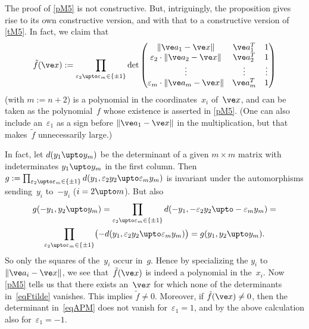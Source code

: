 \documentclass[reqno]{amsart}
\begin{document}
\begin{rem} \label{rM5}%
  The proof of \cref{pM5} is not constructive. But, intriguingly, the
  proposition gives rise to its own constructive version, and with
  that to a constructive version of \cref{tM5}. In fact, we claim that
  \begin{equation} \label{eqFtilde}%
    \tilde f(\ve x) := \prod_{\varepsilon_2 \upto \varepsilon_m \in \{\pm
      1\}} \det\begin{pmatrix}
      \lVert\ve a_1 - \ve x\rVert & \ve a_1^T & 1
      \\
      \varepsilon_2 \cdot \lVert\ve a_2 - \ve x\rVert & \ve a_2^T & 1 \\
      \vdots & \vdots & \vdots \\
      \varepsilon_m \cdot \lVert\ve a_m - \ve x\rVert & \ve
      a_m^T & 1
    \end{pmatrix}
  \end{equation}
  (with $m := n+2$) is a polynomial in the coordinates~$x_i$
  of~$\ve x$, and can be taken as the polynomial~$f$ whose existence
  is asserted in \cref{pM5}. (One can also include an~$\varepsilon_1$
  as a sign before $\lVert\ve a_1 - \ve x\rVert$ in the
  multiplication, but that makes~$\tilde f$ unnecessarily large.)

  In fact, let $d(y_1 \upto y_m)$ be the
  determinant of a given $m \times m$ matrix with indeterminates
  $y_1 \upto y_m$ in the first column. Then
  $g := \prod_{\varepsilon_2 \upto \varepsilon_m \in \{\pm 1\}}
  d(y_1,\varepsilon_2 y_2 \upto \varepsilon_m y_m)$ is invariant under
  the automorphisms sending~$y_i$ to~$-y_i$ ($i = 2 \upto m$). But
  also
  \begin{multline*}
    g(-y_1,y_2 \upto y_m) = \prod_{\varepsilon_2 \upto \varepsilon_m
      \in \{\pm 1\}} d(-y_1,-\varepsilon_2 y_2 \upto -\varepsilon_m
    y_m) = \\
    \prod_{\varepsilon_2 \upto \varepsilon_m \in \{\pm 1\}}
    \bigl(-d(y_1,\varepsilon_2 y_2 \upto \varepsilon_m y_m)\bigr) =
    g(y_1,y_2 \upto y_m).
  \end{multline*}
  So only the squares of the~$y_i$ occur in~$g$. Hence by specializing
  the $y_i$ to $\lVert\ve a_i - \ve x\rVert$, we see
  that~$\tilde f(\ve x)$ is indeed a polynomial in the~$x_i$. Now
  \cref{pM5} tells us that there exists an~$\ve x$ for which none of
  the determinants in~\eqref{eqFtilde} vanishes. This implies
  $\tilde f \ne 0$. Moreover, if $\tilde f(\ve x) \ne 0$, then the
  determinant in~\eqref{eqAPM} does not vanish
  for~$\varepsilon_1 = 1$, and by the above calculation also
  for~$\varepsilon_1 = -1$.
\end{rem}
\end{document}
